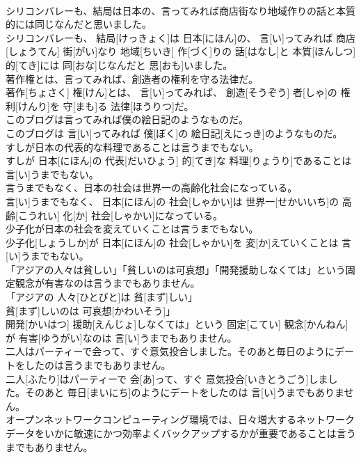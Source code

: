 \documentclass[8pt]{extreport}
\begin{document}
\begin{CJK}{UTF8}{min}
\\	シリコンバレーも、結局は日本の、言ってみれば商店街なり地域作りの話と本質的には同じなんだと思いました。	
\\	シリコンバレーも、 結局[けっきょく]は 日本[にほん]の、 言[い]ってみれば 商店[しょうてん] 街[がい]なり 地域[ちいき] 作[づく]りの 話[はなし]と 本質[ほんしつ] 的[てき]には 同[おな]じなんだと 思[おも]いました。
\\	著作権とは、言ってみれば、創造者の権利を守る法律だ。	
\\	著作[ちょさく] 権[けん]とは、 言[い]ってみれば、 創造[そうぞう] 者[しゃ]の 権利[けんり]を 守[まも]る 法律[ほうりつ]だ。
\\	このブログは言ってみれば僕の絵日記のようなものだ。	
\\	このブログは 言[い]ってみれば 僕[ぼく]の 絵日記[えにっき]のようなものだ。
\\	すしが日本の代表的な料理であることは言うまでもない。	
\\	すしが 日本[にほん]の 代表[だいひょう] 的[てき]な 料理[りょうり]であることは 言[い]うまでもない。
\\	言うまでもなく、日本の社会は世界一の高齢化社会になっている。	
\\	言[い]うまでもなく、 日本[にほん]の 社会[しゃかい]は 世界一[せかいいち]の 高齢[こうれい] 化[か] 社会[しゃかい]になっている。
\\	少子化が日本の社会を変えていくことは言うまでもない。	
\\	少子化[しょうしか]が 日本[にほん]の 社会[しゃかい]を 変[か]えていくことは 言[い]うまでもない。
\\	「アジアの人々は貧しい」「貧しいのは可哀想」「開発援助しなくては」という固定観念が有害なのは言うまでもありません。	
\\	「アジアの 人々[ひとびと]は 貧[まず]しい」
\\	貧[まず]しいのは 可哀想[かわいそう]」
\\	開発[かいはつ] 援助[えんじょ]しなくては」という 固定[こてい] 観念[かんねん]が 有害[ゆうがい]なのは 言[い]うまでもありません。
\\	二人はパーティーで会って、すぐ意気投合しました。そのあと毎日のようにデートをしたのは言うまでもありません。	
\\	二人[ふたり]はパーティーで 会[あ]って、すぐ 意気投合[いきとうごう]しました。そのあと 毎日[まいにち]のようにデートをしたのは 言[い]うまでもありません。
\\	オープンネットワークコンピューティング環境では、日々増大するネットワークデータをいかに敏速にかつ効率よくバックアップするかが重要であることは言うまでもありません。	

\end{CJK}
\end{document}
